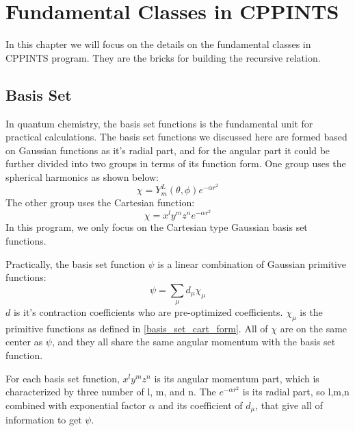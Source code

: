 %
% 
%
\chapter{Fundamental Classes in CPPINTS}
%
%
%
In this chapter we will focus on the details on the fundamental classes
in CPPINTS program. They are the bricks for building the recursive
relation.

\section{Basis Set}
%
%
\label{bs}

In quantum chemistry, the basis set functions is the fundamental 
unit for practical calculations\cite{Davidson_Feller_CR_86_681_1986}. 
The basis set functions we discussed here are formed based on Gaussian 
functions as it's radial part, and for the angular part it could be further 
divided into two groups in terms of its function form.  
One group uses the spherical harmonics as shown below:
\begin{equation}
 \chi = Y_{m}^{L}(\theta,\phi)e^{-\alpha r^{2}}
\end{equation}
The other group uses the Cartesian function:
\begin{equation}\label{basis_set_cart_form}
 \chi = x^{l}y^{m}z^{n}e^{-\alpha r^{2}}
\end{equation}
In this program, we only focus on the Cartesian type
Gaussian basis set functions.

Practically, the basis set function $\psi$ is a linear combination of 
Gaussian primitive functions:
\begin{equation}\label{program_contract_basis_set}
	\psi = \sum_{\mu}d_{\mu}\chi_{\mu}
\end{equation}
$d$ is it's contraction coefficients who are pre-optimized 
coefficients. $\chi_{\mu}$ is the primitive 
functions as defined in \ref{basis_set_cart_form}.
All of $\chi$ are on the same center as $\psi$, and they all share the 
same angular momentum with the basis set function.

For each basis set function, $x^{l}y^{m}z^{n}$ is its angular momentum part,
which is characterized by three number of l, m, and n. The $e^{-\alpha r^{2}}$
is its radial part, so l,m,n combined with exponential factor $\alpha$ and 
its coefficient of $d_{\mu}$, that give all of information to get $\psi$.

